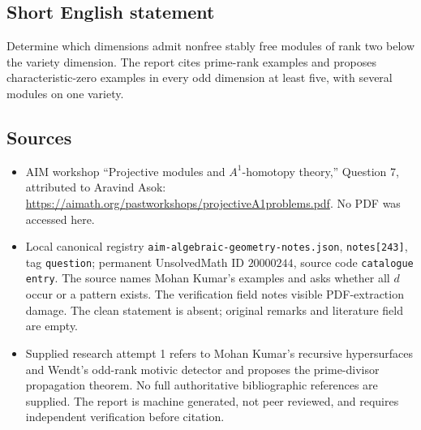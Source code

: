 \documentclass[11pt]{article}
\begin{document}
\subsection{Short English statement}
Determine which dimensions admit nonfree stably free modules of rank two below the variety dimension. The report cites prime-rank examples and proposes characteristic-zero examples in every odd dimension at least five, with several modules on one variety.
\subsection{Sources}
\begin{itemize}
\item AIM workshop ``Projective modules and \(A^1\)-homotopy theory,'' Question 7, attributed to Aravind Asok: \url{https://aimath.org/pastworkshops/projectiveA1problems.pdf}. No PDF was accessed here.
\item Local canonical registry \texttt{aim-algebraic-geometry-notes.json}, \texttt{notes[243]}, tag \texttt{question}; permanent UnsolvedMath ID \(20000244\), source code \texttt{catalogue entry}. The source names Mohan Kumar's examples and asks whether all \(d\) occur or a pattern exists. The verification field notes visible PDF-extraction damage. The clean statement is absent; original remarks and literature field are empty.
\item Supplied research attempt 1 refers to Mohan Kumar's recursive hypersurfaces and Wendt's odd-rank motivic detector and proposes the prime-divisor propagation theorem. No full authoritative bibliographic references are supplied. The report is machine generated, not peer reviewed, and requires independent verification before citation.
\end{itemize}
\end{document}
